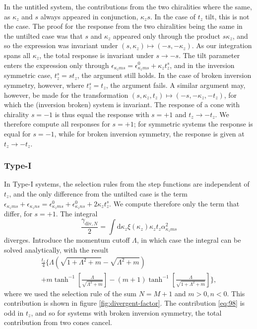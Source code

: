 In the untitled system, the contributions from the two chiralities where the same, as \( \kappa_z \) and \( s \) always appeared in conjunction, \( \kappa_z s \).
In the case of \( t_z \) tilt, this is not the case.
The proof for the response from the two chiralities being the same in the untilted case was that \( s \) and \( \kappa_z \) appeared only through the product \( s \kappa_z \), and so the expression was invariant under \( (s, \kappa_z) \mapsto (-s, -\kappa_z) \).
As our integration spans all \( \kappa_z \), the total response is invariant under \( s \to -s \).
The tilt parameter enters the expression only through \( \epsilon_{\kappa_z m s} = \epsilon_{\kappa_z m s}^0 + \kappa_z t^s_z \), and in the inversion symmetric case, \( t^s_z = s t_z \), the argument still holds.
In the case of broken inversion symmetry, however, where \( t^s_z = t_z \), the argument fails.
A similar argument may, however, be made for the transformation \( (s, \kappa_z, t_z) \mapsto (-s, -\kappa_z, -t_z) \), for which the (inversion broken) system is invariant.
The response of a cone with chirality \( s = -1 \) is thus equal the response with \( s = +1 \) and \( t_z \to -t_z \).
We therefore compute all responses for \( s=+1 \);
for symmetric systems the response is equal for \( s=-1 \), while for broken inversion symmetry, the response is given at \( t_z \to -t_z \).

\subsubsection{Type-I}
In Type-I systems, the selection rules from the step functions are independent of \( t_z \), and the only difference from the untilted case is the term \( \epsilon_{\kappa_z m s} + \epsilon_{\kappa_z n s} = \epsilon^0_{\kappa_z m s} + \epsilon^0_{\kappa_z n s} + 2 \kappa_z t^s_z \).
We compute therefore only the term that differ, for \( s=+1 \).
The integral
\begin{equation}
  \label{eq:97}
  \frac{\gamma_{\text{div}, N}}{2} = \int \mathrm{d}\kappa_z \xi(\kappa_z) \kappa_z t_z \alpha_{\kappa_z m s}^2
\end{equation}
diverges.
Introduce the momentum cutoff \( \Lambda \), in which case the integral can be solved analytically, with the result
\begin{multline}
  \frac{t_z}{4}
  \Bigg\{
    \Lambda\left(\sqrt{1 + \Lambda^2 + m} - \sqrt{\Lambda^2 + m}  \right)\\
    + m \tanh^{-1}\left[\frac{\Lambda}{\sqrt{\Lambda^2 + m} } \right]
    - (m+1) \tanh^{-1}\left[\frac{\Lambda}{\sqrt{1 + \Lambda^2 + m }}\right]
    \Bigg\},
    \label{eq:98}
\end{multline}
where we used the selection rule of the sum \( N=M+1 \) and \( m>0, n<0 \).
This contribution is shown in figure \ref{fig:divergent-factor}.
The contribution \eqref{eq:98} is odd in \( t_z \), and so for systems with broken inversion symmetry, the total contribution from two cones cancel.

